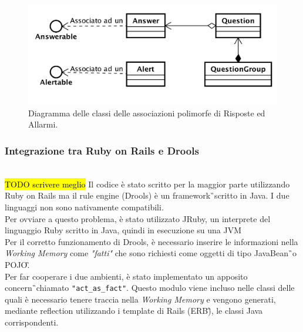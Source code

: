 \begin{figure}[H]
	\begin{center}
		\includegraphics[width=14cm]{Pics/diagramma_classi_associazioni_polimorfe.png}
		\caption{Diagramma delle classi delle associazioni polimorfe di Risposte ed Allarmi.}
		\label{fig:DiagrammaClassiAssociazioniPolimorfe}
	\end{center}
\end{figure}

\subsubsection{Integrazione tra Ruby on Rails e Drools}\mbox{} \\
\hl{TODO scrivere meglio}
Il codice è stato scritto per la maggior parte utilizzando Ruby on Rails ma il rule engine (Drools) è un \gls{framework}\G\ scritto in Java. I due linguaggi non sono nativamente compatibili. \\
Per ovviare a questo problema, è stato utilizzato JRuby, un interprete del linguaggio Ruby scritto in Java, quindi in esecuzione su una \gls{JVM}\G\. \\
Per il corretto funzionamento di Drools, è necessario inserire le informazioni nella \textit{Working Memory} come \textit{"fatti"} che sono richiesti come oggetti di tipo \gls{JavaBean}\G\ o \gls{POJO}\G.\\
Per far cooperare i due ambienti, è stato implementato un apposito  \gls{concern}\G\ chiamato \texttt{"act\_as\_fact"}. Questo modulo viene incluso nelle classi delle quali è necessario tenere traccia nella \textit{Working Memory} e vengono generati, mediante reflection utilizzando i template di Rails (\gls{ERB}\G), le classi Java corrispondenti.








